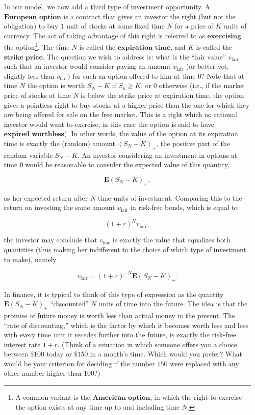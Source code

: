 In our model, we now add a third type of investment
opportunity. A $\textbf{European option}$ is a
contract that gives an investor the right (but not the
obligation) to buy $1$ unit of stocks at some fixed
time $N$ for a price of $K$ units of currency. The
act of taking advantage of this right is referred to
as $\textbf{exercising}$ the
option\footnote{A common variant is the $\textbf{American option}$,
in which the right to exercise the option exists at
any time up to and including time $N$.}. The time $N$ is called
the $\textbf{expiration time}$, and $K$ is called the
$\textbf{strike price}$. The question we wish to
address is: what is the ``fair value''
$v_\textrm{fair}$ such that an investor would
consider paying an amount $v_\textrm{fair}$ (or
better yet, slightly less than $v_\textrm{fair}$) for
such an option offered to him at time $0$? Note that
at time $N$ the option is worth $S_N-K$ if $S_n\ge K$,
or $0$ otherwise (i.e., if the market price of stocks
at time $N$ is below the strike price at expiration
time, the option gives a pointless right to buy stocks
at a higher price than the one for which they are
being offered for sale on the free market. This is a
right which no rational investor would want to
exercise; in this case the option is said to have
$\textbf{expired worthless}$). In other words, the
value of the option at its expiration time is exactly
the (random) amount $(S_N-K)_+$, the positive part of
the random variable $S_N-K$. An investor considering
an investment in options at time $0$ would be
reasonable to consider the expected value of this
quantity,

\[
\mathbf{E}(S_N-K)_+,
\]

\noindent as her expected return after $N$ time units of
investment. Comparing this to the return on investing
the same amount $v_\textrm{fair}$ in risk-free bonds,
which is equal to

\[
(1+r)^N v_\textrm{fair},
\]

\noindent the investor may conclude that $v_\textrm{fair}$ is
exactly the value that equalizes both quantities (thus
making her indifferent to the choice of which type of
investment to make), namely

\begin{equation*} \tag{11}\label{eq:discrete-black-scholes}
v_\textrm{fair} = (1+r)^{-N} \mathbf{E}(S_N-K)_+.
\end{equation*}

\noindent In finance, it is typical to think of this type of
expression as the quantity $\mathbf{E}(S_N-K)_+$
``discounted'' $N$ units of time into the future. The
idea is that the promise of future money is worth less
than actual money in the present. The ``rate of
discounting,'' which is the factor by which it becomes
worth less and less with every time unit it recedes
further into the future, is exactly the risk-free
interest rate $1+r$. (Think of a situation in which
someone offers you a choice between \(\$100\) today
or \(\$150\) in a month's time. Which would you
prefer? What would be your criterion for deciding if
the number $150$ were replaced with any other number
higher than $100$?)

